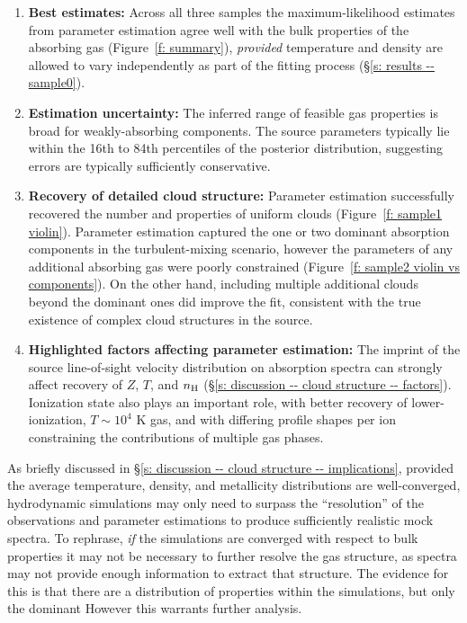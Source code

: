 \documentclass[fleqn,usenatbib]{mnras}
\begin{document}
\begin{enumerate}
    \item \textbf{Best estimates:} Across all three samples the maximum-likelihood estimates from parameter estimation agree well with the bulk properties of the absorbing gas (Figure~\ref{f: summary}), \textit{provided} temperature and density are allowed to vary independently as part of the fitting process (\S\ref{s: results -- sample0}).
    \item \textbf{Estimation uncertainty:} The inferred range of feasible gas properties is broad for weakly-absorbing components. The source parameters typically lie within the 16th to 84th percentiles of the posterior distribution, suggesting errors are typically sufficiently conservative.
    \item \textbf{Recovery of detailed cloud structure:} Parameter estimation successfully recovered the number and properties of uniform clouds (Figure~\ref{f: sample1 violin}). Parameter estimation captured the one or two dominant absorption components in the turbulent-mixing scenario, however the parameters of any additional absorbing gas were poorly constrained (Figure~\ref{f: sample2 violin vs components}).
    On the other hand, including multiple additional clouds beyond the dominant ones did improve the fit, consistent with the true existence of complex cloud structures in the source. 
    \item \textbf{Highlighted factors affecting parameter estimation:} The imprint of the source line-of-sight velocity distribution on absorption spectra can strongly affect recovery of $Z$, $T$, and $n_{\rm H}$ (\S\ref{s: discussion -- cloud structure -- factors}). Ionization state also plays an important role, with better recovery of lower-ionization, $T \sim 10^4$ K gas, and with differing profile shapes per ion constraining the contributions of multiple gas phases.
\end{enumerate}

As briefly discussed in \S\ref{s: discussion -- cloud structure -- implications},
provided the average temperature, density, and metallicity distributions are well-converged,
hydrodynamic simulations may only need to surpass the ``resolution'' of the observations and parameter estimations to produce sufficiently realistic mock spectra.
To rephrase, \textit{if} the simulations are converged with respect to bulk properties it may not be necessary to further resolve the gas structure, as spectra may not provide enough information to extract that structure.
The evidence for this is that there are a distribution of properties within the simulations, but only the dominant
However this warrants further analysis.
\end{document}
